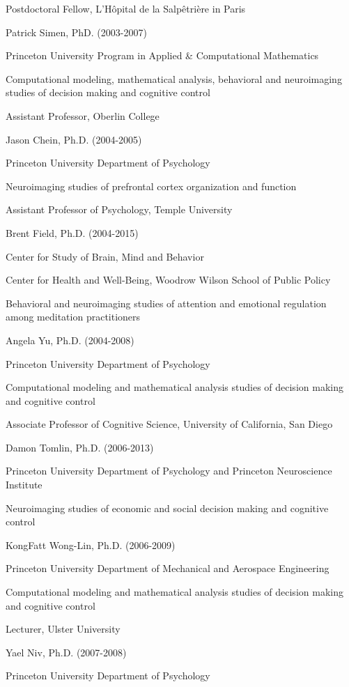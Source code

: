\documentclass[10 pt]{article}
\begin{document}
Postdoctoral Fellow, L'Hôpital de la Salpêtrière in Paris
    \medskip

Patrick Simen, PhD. (2003-2007)

Princeton University Program in Applied \& Computational Mathematics

Computational modeling, mathematical analysis, behavioral and neuroimaging studies of decision making and cognitive control

Assistant Professor, Oberlin College
    \medskip

Jason Chein, Ph.D. (2004-2005)

Princeton University Department of Psychology

Neuroimaging studies of prefrontal cortex organization and function

Assistant Professor of Psychology, Temple University
    \medskip

Brent Field, Ph.D. (2004-2015)

Center for Study of Brain, Mind and Behavior

Center for Health and Well-Being, Woodrow Wilson School of Public Policy

Behavioral and neuroimaging studies of attention and emotional regulation among meditation practitioners
    \medskip

Angela Yu, Ph.D. (2004-2008)

Princeton University Department of Psychology

Computational modeling and mathematical analysis studies of decision making and cognitive control

Associate Professor of Cognitive Science, University of California, San Diego
    \medskip

Damon Tomlin, Ph.D. (2006-2013)

Princeton University Department of Psychology and Princeton Neuroscience Institute

Neuroimaging studies of economic and social decision making and cognitive control
    \medskip

KongFatt Wong-Lin, Ph.D. (2006-2009)

Princeton University Department of Mechanical and Aerospace Engineering

Computational modeling and mathematical analysis studies of decision making and cognitive control

Lecturer, Ulster University
    \medskip

Yael Niv, Ph.D. (2007-2008)

Princeton University Department of Psychology
\end{document}
